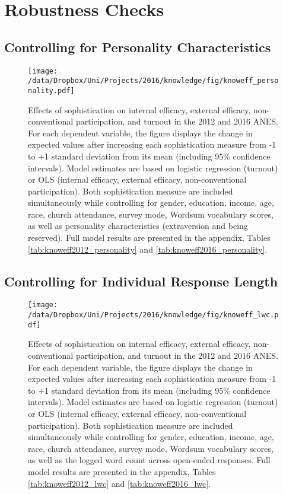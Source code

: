 \clearpage
\section{Robustness Checks}\label{app:personality}

\subsection{Controlling for Personality Characteristics}
\begin{figure}[h]\centering
\texttt{[image: /data/Dropbox/Uni/Projects/2016/knowledge/fig/knoweff\_personality.pdf]}
\caption[Effects of sophistication on political engagement controlling for personality characteristics in the 2012 and 2016 ANES]{Effects of sophistication on internal efficacy, external efficacy, non-conventional participation, and turnout in the 2012 and 2016 ANES. For each dependent variable, the figure displays the change in expected values after increasing each sophistication measure from -1 to +1 standard deviation from its mean (including 95\% confidence intervals). Model estimates are based on logistic regression (turnout) or OLS (internal efficacy, external efficacy, non-conventional participation). Both sophistication measure are included simultaneously while controlling for gender, education, income, age, race, church attendance, survey mode, Wordsum vocabulary scores, as well as personality characteristics (extraversion and being reserved). Full model results are presented in the appendix, Tables \ref{tab:knoweff2012_personality} and \ref{tab:knoweff2016_personality}.
}\label{fig:knoweff_personality}
\end{figure}

\clearpage
\subsection{Controlling for Individual Response Length}
\begin{figure}[h]\centering
\texttt{[image: /data/Dropbox/Uni/Projects/2016/knowledge/fig/knoweff\_lwc.pdf]}
\caption[Effects of sophistication on political engagement controlling for response length in the 2012 and 2016 ANES]{Effects of sophistication on internal efficacy, external efficacy, non-conventional participation, and turnout in the 2012 and 2016 ANES. For each dependent variable, the figure displays the change in expected values after increasing each sophistication measure from -1 to +1 standard deviation from its mean (including 95\% confidence intervals). Model estimates are based on logistic regression (turnout) or OLS (internal efficacy, external efficacy, non-conventional participation). Both sophistication measure are included simultaneously while controlling for gender, education, income, age, race, church attendance, survey mode, Wordsum vocabulary scores, as well as the logged word count across open-ended responses. Full model results are presented in the appendix, Tables \ref{tab:knoweff2012_lwc} and \ref{tab:knoweff2016_lwc}.
}\label{fig:knoweff_lwc}
\end{figure}


